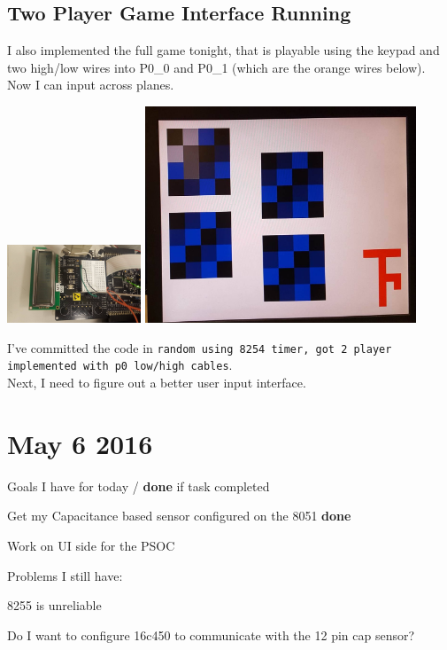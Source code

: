 \documentclass[12pt,twoside]{article}
\newenvironment{tight_itemize}{
\begin{itemize}
  \setlength{\itemsep}{0pt}
  \setlength{\parskip}{0pt}
}{\end{itemize}}
\begin{document}
\subsection{Two Player Game Interface Running}
I also implemented the full game tonight, that is playable using the keypad and two high/low wires into P0\_0 and P0\_1 (which are the orange wires below). Now I can input across planes. 
\begin{center}
\includegraphics[width = 40mm]{Pics/5-4c.jpg}
\includegraphics[width = 81mm]{Pics/5-4a.jpg}
\end{center}
I've committed the code in \texttt{random using 8254 timer, got 2 player implemented with p0 low/high cables}. 
\\ Next, I need to figure out a better user input interface. 


\newpage
\section{May 6 2016}

Goals I have for today / {\bf done} if task completed
\begin{tight_itemize}
\item Get my Capacitance based sensor configured on the 8051 {\bf done}
\item Work on UI side for the PSOC 
\end{tight_itemize}

Problems I still have:
\begin{tight_itemize}
\item 8255 is unreliable
\item Do I want to configure 16c450 to communicate with the 12 pin cap sensor?
\end{tight_itemize}
\end{document}
